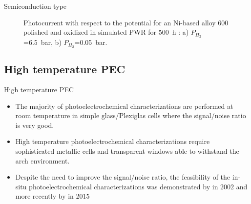 \documentclass[10pt,compress]{beamer}
\begin{document}
\begin{frame}[allowframebreaks=1.0]{Semiconduction type}
\begin{figure}[h]
            \caption{Photocurrent with respect to the potential for an 
            Ni-based alloy 600 polished and oxidized in simulated PWR 
            for 500~h \citep{loucif2013}: a) $P_{H_2}$=6.5~bar, b) $P_{H_2}$=0.05~bar.}
            \label{fig_loucif_sctype}
        \end{figure}
    \end{frame}

\subsection{High temperature PEC}
    \begin{frame}[allowframebreaks=1.0]{High temperature PEC}
        \begin{itemize}
            \item The majority of photoelectrochemical characterizations are performed at 
            room temperature in simple glass/Plexiglas cells where the signal/noise 
            ratio is very good.
            \item High temperature photoelectrochemical characterizations 
            require sophisticated metallic cells and transparent windows 
            able to withstand the arch environment. 
            \item Despite the need to improve the signal/noise ratio, the feasibility of 
            the in-situ photoelectrochemical characterizations was demonstrated by 
            \citet{bojinov2002} in 2002 and more recently by \citet{skocic2016} in 2015 
        \end{itemize}


\end{frame}
\end{document}
